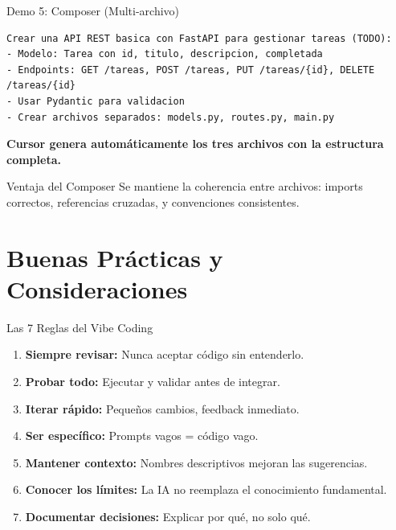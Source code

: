 \documentclass[aspectratio=169]{beamer}
\begin{document}
\begin{frame}[fragile]{Demo 5: Composer (Multi-archivo)}
    \begin{lstlisting}[style=promptstyle, title=Prompt en Cursor Composer]
Crear una API REST basica con FastAPI para gestionar tareas (TODO):
- Modelo: Tarea con id, titulo, descripcion, completada
- Endpoints: GET /tareas, POST /tareas, PUT /tareas/{id}, DELETE /tareas/{id}
- Usar Pydantic para validacion
- Crear archivos separados: models.py, routes.py, main.py
    \end{lstlisting}
    
    \vspace{0.3cm}
    \textbf{Cursor genera automáticamente los tres archivos con la estructura completa.}
    
    \vspace{0.3cm}
    \begin{exampleblock}{Ventaja del Composer}
        Se mantiene la coherencia entre archivos: imports correctos, referencias cruzadas, y convenciones consistentes.
    \end{exampleblock}
\end{frame}

\section{Buenas Prácticas y Consideraciones}

\begin{frame}{Las 7 Reglas del Vibe Coding}
    \begin{enumerate}
        \setlength\itemsep{0.6em}
        \item \textbf{Siempre revisar:} Nunca aceptar código sin entenderlo.
        \item \textbf{Probar todo:} Ejecutar y validar antes de integrar.
        \item \textbf{Iterar rápido:} Pequeños cambios, feedback inmediato.
        \item \textbf{Ser específico:} Prompts vagos = código vago.
        \item \textbf{Mantener contexto:} Nombres descriptivos mejoran las sugerencias.
        \item \textbf{Conocer los límites:} La IA no reemplaza el conocimiento fundamental.
        \item \textbf{Documentar decisiones:} Explicar por qué, no solo qué.
    \end{enumerate}
\end{frame}
\end{document}
